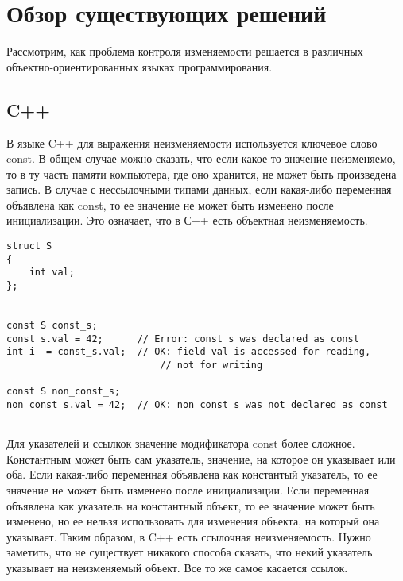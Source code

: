 \section{Обзор существующих решений}

Рассмотрим, как проблема контроля изменяемости решается в различных объектно-ориентированных языках программирования. 

\subsection{C++}

В языке C++ для выражения неизменяемости используется ключевое слово const. В общем случае можно сказать, что если какое-то значение неизменяемо, то в ту часть памяти компьютера, где оно хранится, не может быть произведена запись. В случае с нессылочными типами данных, если какая-либо переменная объявлена как const, то ее значение не может быть изменено после инициализации. Это означает, что в С++ есть объектная неизменяемость.

\begin{lstlisting}[caption=Константая переменная, label=code:const_var]
struct S
{ 
    int val;
};
 

const S const_s;
const_s.val = 42;      // Error: const_s was declared as const
int i  = const_s.val;  // OK: field val is accessed for reading, 
                           // not for writing

const S non_const_s;
non_const_s.val = 42;  // OK: non_const_s was not declared as const
	

\end{lstlisting}

Для указателей и ссылкок значение модификатора const более сложное. Константным может быть сам указатель, значение, на которое он указывает или оба. Если какая-либо переменная объявлена как константый указатель, то ее значение не может быть изменено после инициализации. Если переменная объявлена как указатель на константный объект, то ее значение может быть изменено, но ее нельзя использовать для изменения объекта, на который она указывает. Таким образом, в C++ есть ссылочная неизменяемость. Нужно заметить, что не существует никакого способа сказать, что некий указатель указывает на неизменяемый объект. Все то же самое касается ссылок. 

